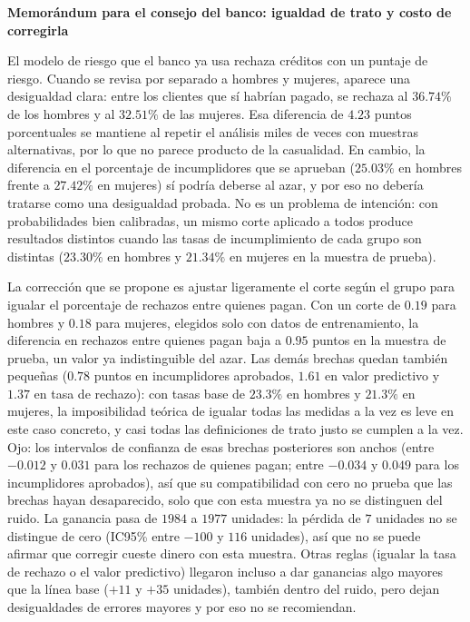 \begin{center}
\textbf{\large Memorándum para el consejo del banco: igualdad de trato y
costo de corregirla}
\end{center}

El modelo de riesgo que el banco ya usa rechaza créditos con un puntaje de
riesgo. Cuando se revisa por separado a hombres y mujeres, aparece una
desigualdad clara: entre los clientes que sí habrían pagado, se rechaza al
$36.74\%$ de los hombres y al $32.51\%$ de las mujeres. Esa diferencia de
$4.23$ puntos porcentuales se mantiene al repetir el análisis miles de veces
con muestras alternativas, por lo que no parece producto de la casualidad. En
cambio, la diferencia en el porcentaje de incumplidores que se aprueban
($25.03\%$ en hombres frente a $27.42\%$ en mujeres) sí podría deberse al
azar, y por eso no debería tratarse como una desigualdad probada. No es un
problema de intención: con probabilidades bien calibradas, un mismo corte
aplicado a todos produce resultados distintos cuando las tasas de
incumplimiento de cada grupo son distintas ($23.30\%$ en hombres y
$21.34\%$ en mujeres en la muestra de prueba).

La corrección que se propone es ajustar ligeramente el corte según el grupo
para igualar el porcentaje de rechazos entre quienes pagan. Con un corte de
$0.19$ para hombres y $0.18$ para mujeres, elegidos solo con datos de
entrenamiento, la diferencia en rechazos entre quienes pagan baja a $0.95$
puntos en la muestra de prueba, un valor ya indistinguible del azar. Las
demás brechas quedan también pequeñas ($0.78$ puntos en incumplidores
aprobados, $1.61$ en valor predictivo y $1.37$ en tasa de rechazo): con tasas
base de $23.3\%$ en hombres y $21.3\%$ en mujeres, la imposibilidad teórica
de igualar todas las medidas a la vez es leve en este caso concreto, y casi
todas las definiciones de trato justo se cumplen a la vez. Ojo: los intervalos
de confianza de esas brechas posteriores son anchos (entre $-0.012$ y $0.031$
para los rechazos de quienes pagan; entre $-0.034$ y $0.049$ para los
incumplidores aprobados), así que su compatibilidad con cero no prueba que
las brechas hayan desaparecido, solo que con esta muestra ya no se distinguen
del ruido. La ganancia pasa
de $1984$ a $1977$ unidades: la pérdida de $7$ unidades no se distingue de
cero (IC95\% entre $-100$ y $116$ unidades), así que no se puede afirmar que
corregir cueste dinero con esta muestra. Otras reglas (igualar la tasa de
rechazo o el valor predictivo) llegaron incluso a dar ganancias algo mayores
que la línea base ($+11$ y $+35$ unidades), también dentro del ruido, pero
dejan desigualdades de errores mayores y por eso no se recomiendan.

